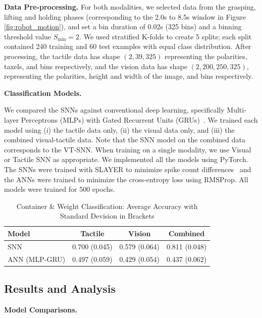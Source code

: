 \documentclass[fyp]{socreport}
\begin{document}
\noindent\textbf{Data Pre-processing.}
For both modalities, we selected data from the grasping, lifting and holding
phases (corresponding to the 2.0s to 8.5s window in Figure
\ref{fig:robot_motion}), and set a bin duration of 0.02s (325 bins) and a
binning threshold value $S_{\text{min}} = 2$. We used stratified K-folds to
create 5 splits; each split contained 240 training and 60 test examples with
equal class distribution. After processing, the tactile data has shape
$(2, 39, 325)$ representing the polarities, taxels, and bins respectively, and
the vision data has shape $(2, 200, 250, 325)$, representing the polarities,
height and width of the image, and bins respectively.

\noindent\textbf{Classification Models.}

We compared the SNNs against conventional deep learning, specifically
Multi-layer Perceptrons (MLPs) with Gated Recurrent Units
(GRUs)~\cite{cho2014learning}. We trained each model using (i) the tactile data
only, (ii) the visual data only, and (iii) the combined visual-tactile data.
Note that the SNN model on the combined data corresponds to the VT-SNN. When
training on a single modality, we use Visual or Tactile SNN as appropriate. We
implemented all the models using PyTorch. The SNNs were trained with SLAYER to
minimize spike count differences~\cite{NIPS2018_7415} and the ANNs were trained
to minimize the cross-entropy loss using RMSProp. All models were trained for
500 epochs.

\begin{table}
  \centering
  \caption{Container \& Weight Classification: Average Accuracy with Standard Devision in Brackets}
  \label{tbl:classacc325}
  \begin{tabular}{l|ccc}
    \hline
    \hline
    \textbf{Model} & \textbf{Tactile} & \textbf{Vision} & \textbf{Combined} \\
    \hline
    SNN  & {0.700} (0.045) & 0.579 (0.064)  & 0.811 (0.048)\\
    \hline
    ANN (MLP-GRU) & 0.497 (0.059) & 0.429 (0.054) & 0.437 (0.062)\\
    \hline
    \hline
  \end{tabular}
\end{table}

\subsection{Results and Analysis}

\noindent\textbf{Model Comparisons.}
\end{document}
